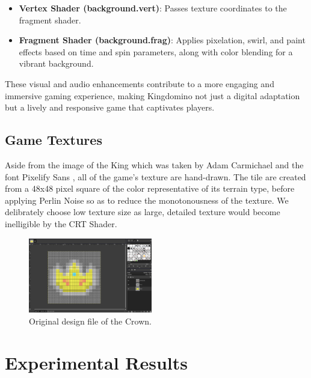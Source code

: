 \documentclass[conference]{IEEEtran}
\begin{document}
\begin{itemize}
    \item \textbf{Vertex Shader (background.vert)}: Passes texture coordinates to the fragment shader.
    \item \textbf{Fragment Shader (background.frag)}: Applies pixelation, swirl, and paint effects based on time and spin parameters, along with color blending for a vibrant background.
\end{itemize}

These visual and audio enhancements contribute to a more engaging and immersive
gaming experience, making Kingdomino not just a digital adaptation but a lively
and responsive game that captivates players.

\subsection{Game Textures}

Aside from the image of the King which was taken by Adam Carmichael \cite{github:carmichael-repo} and the font Pixelify Sans \cite{github:pixelify-sans}, all of the game's texture are hand-drawn. The tile are created from a 48x48 pixel square of the color representative of its terrain type, before applying Perlin Noise \cite{wiki:perlin-noise} so as to reduce the monotonousness of the texture. We delibrately choose low texture size as large, detailed texture would become inelligible by the CRT Shader.

\begin{figure}[htbp]
    \centerline{\includegraphics[width=0.48\textwidth]{assets/crown-design-file.png}}
    \caption{Original design file of the Crown.}\label{fig:crown-design}
\end{figure}

\section{Experimental Results}
\end{document}

